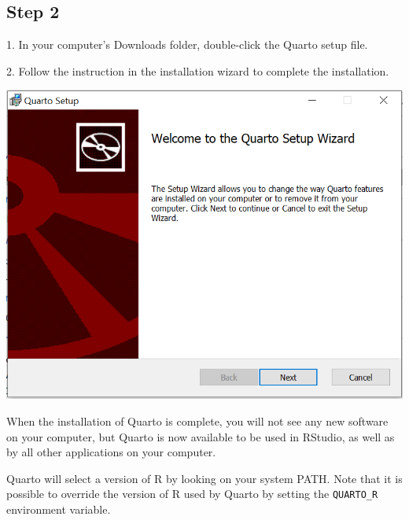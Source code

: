 \documentclass[
  letterpaper,
  DIV=11,
  numbers=noendperiod,
  oneside]{scrreprt}
\begin{document}
\subsection{Step 2}

1. In your computer's Downloads folder, double-click the Quarto setup
file.

2. Follow the instruction in the installation wizard to complete the
installation.

\includegraphics{images/paste-FE57875E.png}

\begin{tcolorbox}[enhanced jigsaw, coltitle=black, opacityback=0, title=\textcolor{quarto-callout-important-color}{\faExclamation}\hspace{0.5em}{Important}, toprule=.15mm, bottomtitle=1mm, colbacktitle=quarto-callout-important-color!10!white, colframe=quarto-callout-important-color-frame, left=2mm, opacitybacktitle=0.6, bottomrule=.15mm, arc=.35mm, toptitle=1mm, colback=white, titlerule=0mm, breakable, leftrule=.75mm, rightrule=.15mm]

When the installation of Quarto is complete, you will not see any new
software on your computer, but Quarto is now available to be used in
RStudio, as well as by all other applications on your computer.

Quarto will select a version of R by looking on your system PATH. Note
that it is possible to override the version of R used by Quarto by
setting the \texttt{QUARTO\_R} environment variable.

\end{tcolorbox}
\end{document}
